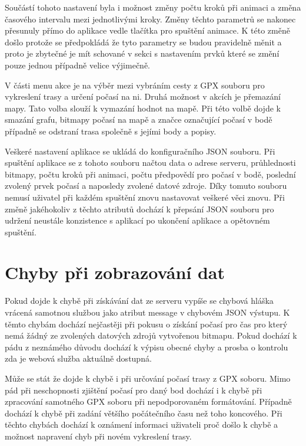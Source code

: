 \documentclass[czech,bachelor,dept460,male,csharp,cpdeclaration]{diploma}
\begin{document}
	Součástí tohoto nastavení byla i možnost změny počtu kroků při animaci a změna časového intervalu mezi jednotlivými kroky. Změny těchto parametrů se nakonec přesunuly přímo do aplikace vedle tlačítka pro spuštění animace. K této změně došlo protože se předpokládá že tyto parametry se budou pravidelně měnit a proto je zbytečné je mít schované v sekci s nastavením prvků které se změní pouze jednou případně velice výjimečně.
	
	V části menu akce je na výběr mezi vybráním cesty z GPX souboru pro vykreslení trasy a určení počasí na ni. Druhá možnost v akcích je přemazání mapy. Tato volba slouží k vymazání hodnot na mapě. Při této volbě dojde k smazání grafu, bitmapy počasí na mapě a značce označující počasí v bodě případně se odstraní trasa společně s jejími body a popisy.
	
	Veškeré nastavení aplikace se ukládá do konfiguračního JSON souboru. Při spuštění aplikace se z tohoto souboru načtou data o adrese serveru, průhlednosti bitmapy, počtu kroků při animaci, počtu předpovědí pro počasí v bodě, poslední zvolený prvek počasí a naposledy zvolené datové zdroje. Díky tomuto souboru nemusí uživatel při každém spuštění znovu nastavovat veškeré věci znovu. Při změně jakéhokoliv z těchto atributů dochází k přepsání JSON souboru pro udržení neustále konzistence s aplikací po ukončení aplikace a opětovném spuštění.
	
	\section{Chyby při zobrazování dat}
	
	Pokud dojde k chybě při získávání dat ze serveru vypíše se chybová hláška vrácená samotnou službou jako atribut message v chybovém JSON výstupu. K těmto chybám dochází nejčastěji při pokusu o získání počasí pro čas pro který nemá žádný ze zvolených datových zdrojů vytvořenou bitmapu. Pokud dochází k pádu z neznámého důvodu dochází k výpisu obecné chyby a prosba o kontrolu zda je webová služba aktuálně dostupná.
	
	Může se stát že dojde k chybě i při určování počasí trasy z GPX soboru. Mimo pád při neschopnosti zjištění počasí pro daný bod dochází i k chybě při zpracování samotného GPX soboru při nepodporovaném formátování. Případně dochází k chybě při zadání většího počátečního času než toho koncového. Při těchto chybách dochází k oznámení informaci uživateli proč došlo k chybě a možnost napravení chyb při novém vykreslení trasy.
	
\end{document}
